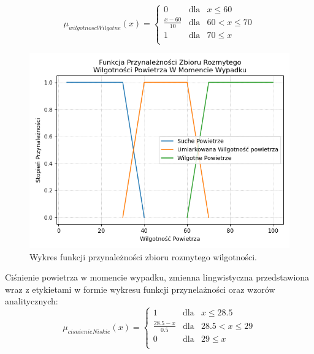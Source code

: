 \documentclass{classrep}
\begin{document}
\begin{equation}
\mu _{wilgotnoscWilgotne}(x) =  \left\{ \begin{array}{rcl}
 0 & \mbox{dla} & x \leq 60 \\
\frac{x - 60}{10} & \mbox{dla} & 60 < x \leq 70\\
1 & \mbox{dla} & 70 \leq x\\
\end{array}\right.
\end{equation}

\begin{figure}[h!]
 \centering
 \includegraphics[width=14cm]{FunkcjaPrzynaleznosciWilgotnosc.png}
 \vspace{-0.3cm}
 \caption{Wykres funkcji przynależności zbioru rozmytego wilgotności. }
 \label{rysunek do eksperymentu 1 wariantu 1}
\end{figure}
\newpage


Ciśnienie powietrza w momencie wypadku, zmienna lingwistyczna przedstawiona wraz z etykietami w formie wykresu funkcji przynelażności oraz wzorów analitycznych:
\begin{equation}
\mu _{cisnienieNiskie}(x) =  \left\{ \begin{array}{rcl}
 1 & \mbox{dla} & x  \leq 28.5 \\
\frac{28.5 - x}{0.5} & \mbox{dla} & 28.5 < x \leq 29\\
0 & \mbox{dla} & 29 \leq x\\
\end{array}\right.
\end{equation}
\end{document}

